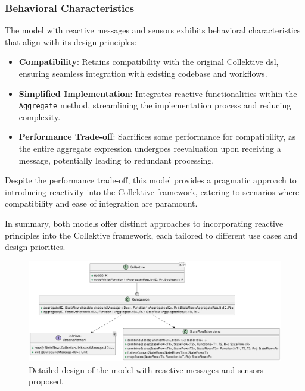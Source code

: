\subsubsection{Behavioral Characteristics}

The model with reactive messages and sensors exhibits behavioral characteristics that align with its design principles:

\begin{itemize}
    \item \textbf{Compatibility}: Retains compatibility with the original Collektive \ac{dsl}, ensuring seamless integration with existing codebase and workflows.
    \item \textbf{Simplified Implementation}: Integrates reactive functionalities within the \texttt{Aggregate} method, streamlining the implementation process and reducing complexity.
    \item \textbf{Performance Trade-off}: Sacrifices some performance for compatibility, as the entire aggregate expression undergoes reevaluation upon receiving a message, potentially leading to redundant processing.
\end{itemize}

Despite the performance trade-off, this model provides a pragmatic approach to introducing reactivity into the Collektive framework, catering to scenarios where compatibility and ease of integration are paramount.

In summary, both models offer distinct approaches to incorporating reactive principles into the Collektive framework, each tailored to different use cases and design priorities.

\begin{figure}
    \centering
    \includegraphics[width=\linewidth]{figures/collektive-rmsm-design.pdf}
    \caption{Detailed design of the model with reactive messages and sensors proposed.}
    \label{fig:collektive-rmsm-design}
\end{figure}
